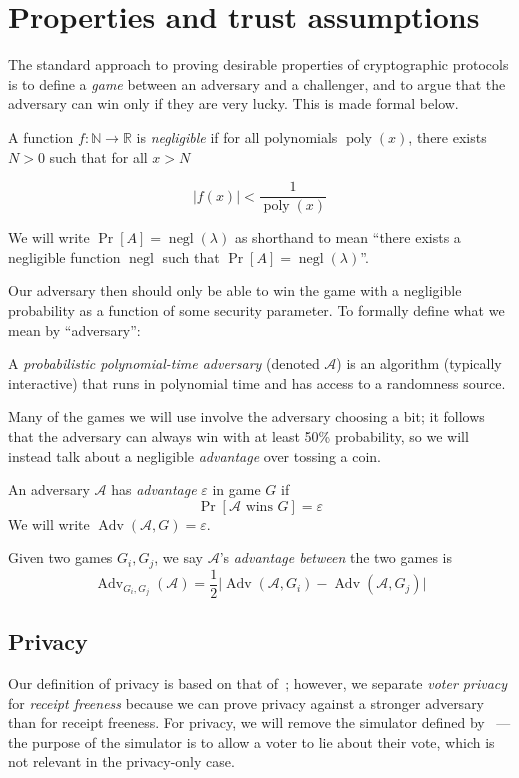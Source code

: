 \documentclass[12pt,a4paper]{article}
\DeclareMathOperator{\poly}{\text{poly}}
\DeclareMathOperator{\negl}{\text{negl}}
\DeclareMathOperator{\Adv}{\text{Adv}}
\theoremstyle{definition}
\begin{document}
\section{Properties and trust assumptions}\label{sec-properties}
The standard approach to proving desirable properties of cryptographic protocols is to define a \textit{game} between an adversary and a challenger, and to argue that the adversary can win only if they are very lucky. This is made formal below.
\begin{definition}
    A function $f:\mathbb{N}\rightarrow\mathbb{R}$ is \textit{negligible} if for all polynomials $\poly(x)$, there exists $N>0$ such that for all $x>N$

    $$|f(x)|<\frac{1}{\poly(x)}$$

    We will write $\Pr[A]=\negl(\lambda)$ as shorthand to mean ``there exists a negligible function $\negl$ such that $\Pr[A]=\negl(\lambda)$''.
\end{definition}
Our adversary then should only be able to win the game with a negligible probability as a function of some security parameter. To formally define what we mean by ``adversary'':
\begin{definition}
    A \textit{probabilistic polynomial-time adversary} (denoted $\mathcal{A}$) is an algorithm (typically interactive) that runs in polynomial time and has access to a randomness source.
\end{definition}
Many of the games we will use involve the adversary choosing a bit; it follows that the adversary can always win with at least 50\% probability, so we will instead talk about a negligible \textit{advantage} over tossing a coin. 
\begin{definition}[Advantage]
    An adversary $\mathcal{A}$ has \textit{advantage} $\varepsilon$ in game $G$ if
    $$\Pr\left[\mathcal{A}\text{ wins }G\right]=\varepsilon$$
    We will write $\Adv(\mathcal{A}, G)=\varepsilon$.

    Given two games $G_i, G_j$, we say $\mathcal{A}$'s \textit{advantage between} the two games is
    $$\Adv_{G_i, G_j}(\mathcal{A}) = \frac{1}{2}
    \Big|
        \Adv(\mathcal{A}, G_i)
         -
        \Adv(\mathcal{A}, G_j)
    \Big|$$
\end{definition}
\subsection{Privacy}
Our definition of privacy is based on that of~\cite{kiayias2015end}; however, we separate \textit{voter privacy} for \textit{receipt freeness} because we can prove privacy against a stronger adversary than for receipt freeness. For privacy, we will remove the simulator defined by~\cite{kiayias2015end} --- the purpose of the simulator is to allow a voter to lie about their vote, which is not relevant in the privacy-only case.
\end{document}
